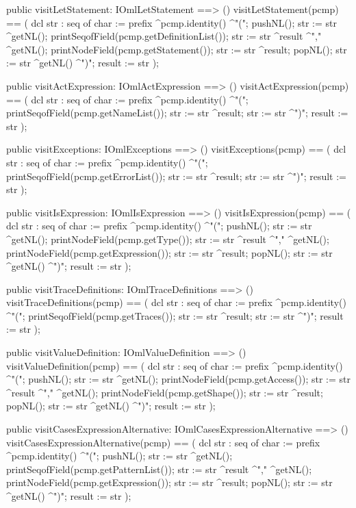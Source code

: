 \begin{vdm_al}
  public visitLetStatement: IOmlLetStatement ==> ()
  visitLetStatement(pcmp) ==
    ( dcl str : seq of char := prefix ^pcmp.identity() ^"(";
      pushNL();
      str := str ^getNL();
      printSeqofField(pcmp.getDefinitionList());
      str := str ^result ^"," ^getNL();
      printNodeField(pcmp.getStatement());
      str := str ^result;
      popNL();
      str := str ^getNL() ^")";
      result := str );

  public visitActExpression: IOmlActExpression ==> ()
  visitActExpression(pcmp) ==
    ( dcl str : seq of char := prefix ^pcmp.identity() ^"(";
      printSeqofField(pcmp.getNameList());
      str := str ^result;
      str := str ^")";
      result := str );

  public visitExceptions: IOmlExceptions ==> ()
  visitExceptions(pcmp) ==
    ( dcl str : seq of char := prefix ^pcmp.identity() ^"(";
      printSeqofField(pcmp.getErrorList());
      str := str ^result;
      str := str ^")";
      result := str );

  public visitIsExpression: IOmlIsExpression ==> ()
  visitIsExpression(pcmp) ==
    ( dcl str : seq of char := prefix ^pcmp.identity() ^"(";
      pushNL();
      str := str ^getNL();
      printNodeField(pcmp.getType());
      str := str ^result ^"," ^getNL();
      printNodeField(pcmp.getExpression());
      str := str ^result;
      popNL();
      str := str ^getNL() ^")";
      result := str );

  public visitTraceDefinitions: IOmlTraceDefinitions ==> ()
  visitTraceDefinitions(pcmp) ==
    ( dcl str : seq of char := prefix ^pcmp.identity() ^"(";
      printSeqofField(pcmp.getTraces());
      str := str ^result;
      str := str ^")";
      result := str );

  public visitValueDefinition: IOmlValueDefinition ==> ()
  visitValueDefinition(pcmp) ==
    ( dcl str : seq of char := prefix ^pcmp.identity() ^"(";
      pushNL();
      str := str ^getNL();
      printNodeField(pcmp.getAccess());
      str := str ^result ^"," ^getNL();
      printNodeField(pcmp.getShape());
      str := str ^result;
      popNL();
      str := str ^getNL() ^")";
      result := str );

  public visitCasesExpressionAlternative: IOmlCasesExpressionAlternative ==> ()
  visitCasesExpressionAlternative(pcmp) ==
    ( dcl str : seq of char := prefix ^pcmp.identity() ^"(";
      pushNL();
      str := str ^getNL();
      printSeqofField(pcmp.getPatternList());
      str := str ^result ^"," ^getNL();
      printNodeField(pcmp.getExpression());
      str := str ^result;
      popNL();
      str := str ^getNL() ^")";
      result := str );


\end{vdm_al}
